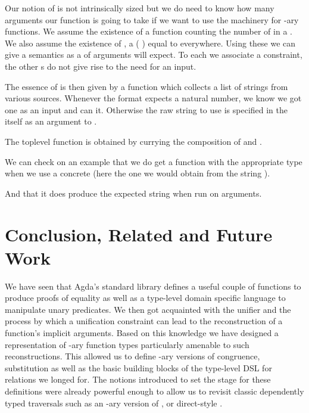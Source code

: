 {Our notion of  is not intrinsically sized but we do need to know
how many arguments our  function is going to take if we want to use
the machinery for -ary functions. We assume the existence of a 
function counting the number of  in a . We also assume the
existence of , a ( ) equal to  everywhere. Using
these we can give  a semantics as a  of arguments 
will expect. To each  we associate a  constraint, the other
s do not give rise to the need for an input.


The essence of  is then given by a function  which
collects a list of strings from various sources. Whenever the format expects
a natural number, we know we got one as an input and can  it.
Otherwise the raw string to use is specified in the  itself as
an argument to .


The toplevel function is obtained by currying the composition of
 and .


We can check on an example that we do get a function with the appropriate
type when we use a concrete  (here the one we would obtain from
the string ).


And that it does produce the expected string when run on arguments.


\section{Conclusion, Related and Future Work}

We have seen that Agda's standard library defines a useful couple of functions
to produce proofs of equality as well as a type-level domain specific language
to manipulate unary predicates. We then got acquainted with the unifier and the
process by which a unification constraint can lead to the reconstruction of a
function's implicit arguments. Based on this knowledge we have designed a
representation of -ary function types particularly amenable to such
reconstructions. This allowed us to define -ary versions of congruence,
substitution as well as the basic building blocks of the type-level DSL for
relations we longed for. The notions introduced to set the stage for these
definitions were already powerful enough to allow us to revisit classic
dependently typed traversals such as an -ary version of ,
or direct-style .

}
